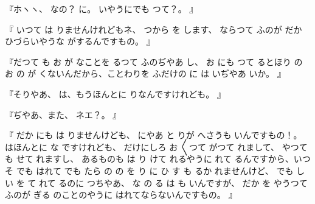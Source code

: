 『ホヽヽ、
なの？
に。
いやうにでも
つて？。
』

『
いつて
は
りませんけれどもネ、
つから
を
します、
ならつて
ふのが
だか
ひづらいやうな
がするんですもの。
』

『だつて
も
お
が
なことを
るつて
ふのぢやあ
し、
お
にも
つて
るとほり
の
お
の
が
くないんだから、ことわりを
ふだけの
に
は
いぢやあ
いか。
』

『そりやあ、
は、もうほんとに
りなんですけれども。
』

『ぢやあ、また、
ネエ？。
』

『
だか
にも
は
りませんけども、
にやあ
と
りが
へさうも
いんですもの！。
はほんとに
な
ですけれども、
だけにしろ
お
〳〵つて
がつて
れまして、
やつて
も
せて
れますし、
あるものも
は
り
けて
れるやうに
れて
るんですから、いつそ
でも
はれて
でも
たら
の
の
を
り
に
ひ
す
も
るか
れませんけど、
でも
しい
を
て
れて
るのに
つちやあ、
な
の
る
は
も
いんですが、
だか
を
やうつて
ふのが
ぎる
のことのやうに
はれてならないんですもの。
』

